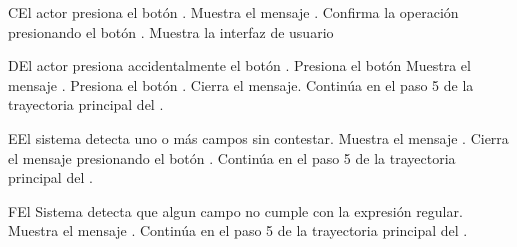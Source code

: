 \begin{UCtrayectoriaA}{C}{El actor presiona el botón .}
	\UCpaso Muestra el mensaje .
	\UCpaso[\UCactor] Confirma la operación presionando el botón .
	\UCpaso Muestra la interfaz de usuario 
\end{UCtrayectoriaA}
\begin{UCtrayectoriaA}{D}{El actor presiona accidentalmente el botón .}
	\UCpaso[\UCactor] Presiona el botón 
	\UCpaso Muestra el mensaje .
	\UCpaso[\UCactor] Presiona el botón .
	\UCpaso Cierra el mensaje.
	\UCpaso Continúa en el paso 5 de la trayectoria principal del .
\end{UCtrayectoriaA}
\begin{UCtrayectoriaA}{E}{El sistema detecta uno o más campos sin contestar.}
	\UCpaso Muestra el mensaje .
	\UCpaso[\UCactor] Cierra el mensaje presionando el botón .
	\UCpaso Continúa en el paso 5 de la trayectoria principal del .
\end{UCtrayectoriaA}
\begin{UCtrayectoriaA}{F}{El Sistema detecta que algun campo no cumple con la expresión regular.}
	\UCpaso Muestra el mensaje .
	\UCpaso Continúa en el paso 5 de la trayectoria principal del .
\end{UCtrayectoriaA}